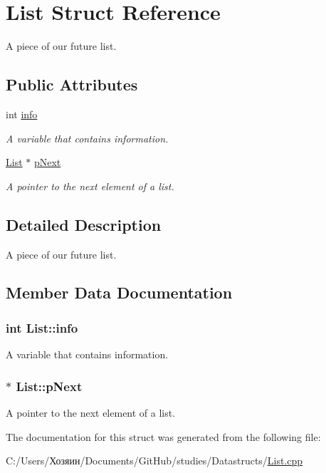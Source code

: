 \hypertarget{struct_list}{}\section{List Struct Reference}
\label{struct_list}


A piece of our future list.  


\subsection*{Public Attributes}
\begin{DoxyCompactItemize}
\item 
int \hyperlink{struct_list_ac85af369aab89e2230cc25588fde4de9}{info}
\begin{DoxyCompactList}\small\item\em A variable that contains information. \end{DoxyCompactList}\item 
\hyperlink{struct_list}{List} $\ast$ \hyperlink{struct_list_afd31befddfdf11894ce8b4c518cdc45e}{p\+Next}
\begin{DoxyCompactList}\small\item\em A pointer to the next element of a list. \end{DoxyCompactList}\end{DoxyCompactItemize}


\subsection{Detailed Description}
A piece of our future list. 

\subsection{Member Data Documentation}
\hypertarget{struct_list_ac85af369aab89e2230cc25588fde4de9}{}
\subsubsection[{info}]{\setlength{\rightskip}{0pt plus 5cm}int List\+::info}\label{struct_list_ac85af369aab89e2230cc25588fde4de9}


A variable that contains information. 

\hypertarget{struct_list_afd31befddfdf11894ce8b4c518cdc45e}{}
\subsubsection[{p\+Next}]{$\ast$ List\+::p\+Next}\label{struct_list_afd31befddfdf11894ce8b4c518cdc45e}


A pointer to the next element of a list. 



The documentation for this struct was generated from the following file\+:\begin{DoxyCompactItemize}
\item 
C\+:/\+Users/Хозяин/\+Documents/\+Git\+Hub/studies/\+Datastructs/\hyperlink{_list_8cpp}{List.\+cpp}\end{DoxyCompactItemize}
